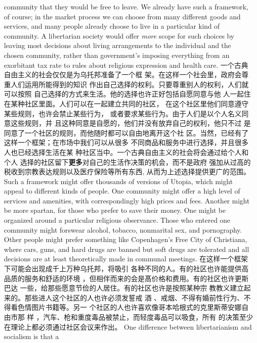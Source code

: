 \begin{paracol}{2}
community that they would be free to leave. We already have
such a framework, of course; in the market process we can
choose from many different goods and services, and many people already choose to live in a particular kind of community. A
libertarian society would offer \textit{more} scope for such choices by
leaving most decisions about living arrangements to the individual and the chosen community, rather than government's
imposing everything from an exorbitant tax rate to rules about
religious expression and health care.
\switchcolumn
一个古典自由主义的社会仅仅是为乌托邦准备了一个框
架。在这样一个社会里，政府会尊重人们运用所能得到的知识
作出自己选择的权利。只要尊重别人的权利，人们就可以按照
自己选择的方式来生活。他的选择也许正好包括自愿同意与他
人一起住在某种社区里面。人们可以在一起建立共同的社区，
在这个社区里他们同意遵守某些规则，也许会禁止某些行为，
或者要求某些行为。由于人们是以个人名义同意这些规则，并
且这种同意是自愿的，他们并没有放弃自己的权利，他只不过
是同意了一个社区的规则，而他随时都可以自由地离开这个社
区。当然，已经有了这样一个框架；在市场中我们可以从很多
不同商品和服务中进行选择，并且很多人也已经选择生活在某
种社区当中。一个古典自由主义的社会将会通过给个人和个人
选择的社区留下\textbf{更多}对自己的生活作决策的机会，而不是政府
强加从过高的税收到宗教表达规则以及医疗保险等所有东西,
从而为上述选择提供更广的范围。
\switchcolumn*
Such a framework might offer thousands of versions of
Utopia, which might appeal to different kinds of people. One
community might offer a high level of services and amenities,
with correspondingly high prices and fees. Another might be
more spartan, for those who prefer to save their money. One
might be organized around a particular religious observance.
Those who entered one community might forswear alcohol, tobacco, nonmarital sex, and pornography. Other people might
prefer something like Copenhagen's Free City of Christiana,
where cars, guns, and hard drugs are banned but soft drugs are
tolerated and all decisions are at least theoretically made in
communal meetings.
\switchcolumn
在这样一个框架下可能会出现成千上万种乌托邦，将吸引
各种不同的人。有的社区也许能提供高品质的服务和舒适的环境 ，但相伴而来的会是髙价格和费用。有的社区也许更斯巴达
一些，给那些愿意节俭的人居住。有的社区也许是按照某种宗
教教义建立起来的。那些进人这个社区的人也许必须发誓戒
酒 、戒烟、不得有婚前性行为、不得看色情图片书籍等。另一
个社区的人也许喜欢像哥本哈根式的克里斯蒂安娜自由市那
样 ，汽车、枪和重度毒品被禁止，而轻度毒品可以吸食，所有
的决策至少在理论上都必须通过社区会议来作出。
\switchcolumn*
One difference between libertarianism and socialism is that a

\end{paracol}
